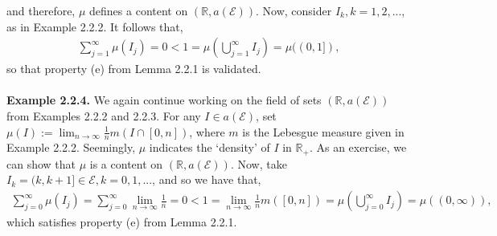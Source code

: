 \documentclass{article}
\begin{document}
and therefore, $\mu$ defines a content on $(\mathbb{R}, a(\mathcal{E}))$. Now, consider $I_k, k = 1,2,...$, as in Example 2.2.2. It follows that,
\begin{eqnarray}
	\nonumber
	\sum_{j=1}^{\infty}\mu(I_j) = 0 < 1 = \mu\left(\bigcup_{j=1}^{\infty}I_j\right) = \mu((0,1]),
\end{eqnarray}
so that property (e) from Lemma 2.2.1 is validated.\\\\
\textbf{Example 2.2.4.} We again continue working on the field of sets $(\mathbb{R}, a(\mathcal{E}))$ from Examples 2.2.2 and 2.2.3. For any $I \in a(\mathcal{E})$, set $\mu(I) := \lim_{n\to\infty}\frac{1}{n}m(I \cap [0,n])$, where $m$ is the Lebesgue measure given in Example 2.2.2. Seemingly, $\mu$ indicates the ‘density’ of $I$ in $\mathbb{R}_{+}$. As an exercise, we can show that $\mu$ is a content on $(\mathbb{R}, a(\mathcal{E}))$. Now, take $I_k = (k,k+1] \in \mathcal{E}, k = 0,1,...$, and so we have that,
\begin{eqnarray}
	\nonumber
	\sum_{j=0}^{\infty}\mu(I_j) = \sum_{j=0}^{\infty}\lim_{n\to\infty}\frac{1}{n} = 0 < 1 = \lim_{n\to\infty}\frac{1}{n}m([0,n]) = \mu\left(\bigcup_{j=0}^{\infty}I_j\right) = \mu((0,\infty)),
\end{eqnarray}
which satisfies property (e) from Lemma 2.2.1.
\end{document}
